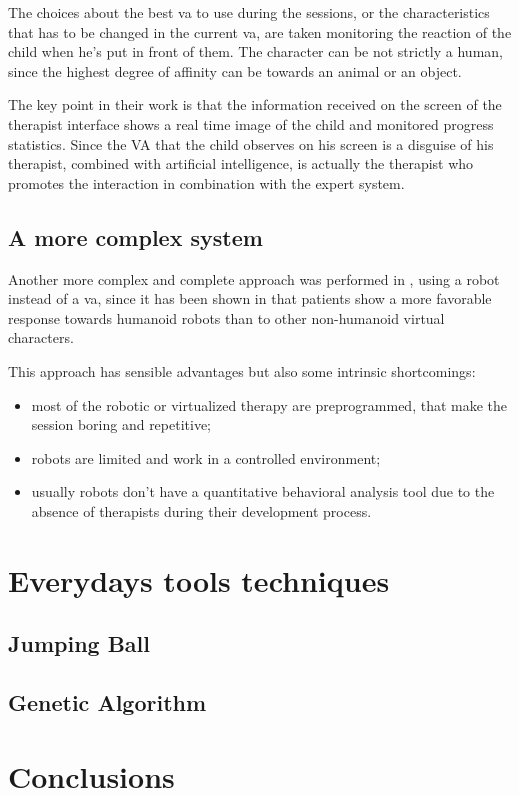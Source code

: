 \documentclass[12pt,journal,draftclsnofoot,onecolumn]{IEEEtran}
\begin{document}
The choices about the best \gls{va} to use during the sessions, or the characteristics that has to be changed in the current \gls{va}, are taken monitoring the reaction of the child when he's put in front of them.
The character can be not strictly a human, since the highest degree of affinity can be towards an animal or an object.

The key point in their work is that the information received on the screen of the therapist interface shows a real time image of the child and monitored progress statistics.
Since the VA that the child observes on his screen is a disguise of his therapist, combined with artificial intelligence, is actually the therapist who promotes the interaction in combination with the expert system.

\subsection{A more complex system}
\label{sec:avatar_complex}

Another more complex and complete approach was performed in \cite{Alahbabi17}, using a robot instead of a \gls{va}, since it has been shown in \cite{Pioggia08} that patients show a more favorable response towards humanoid robots than to other non-humanoid virtual characters.

This approach has sensible advantages but also some intrinsic shortcomings:
\begin{itemize}
	\item most of the robotic or virtualized therapy are preprogrammed, that make the session boring and repetitive;
	\item robots are limited and work in a controlled environment;
	\item usually robots don't have a quantitative behavioral analysis tool due to the absence of therapists during their development process.
\end{itemize}


\section{Everydays tools techniques}
\label{sec:every_tech}

\subsection{Jumping Ball}
\subsection{Genetic Algorithm}

\section{Conclusions}\label{sec:conclusions}



\end{document}
